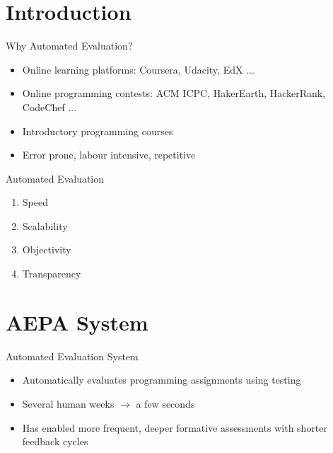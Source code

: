 \documentclass[aspectratio=169]{beamer}
\begin{document}
\section{Introduction}

\begin{frame}{Why Automated Evaluation?}

\begin{itemize}
\item Online learning platforms: Coursera, Udacity, EdX ...
\item Online programming contests: ACM ICPC, HakerEarth, HackerRank, CodeChef ...
\pause
\item Introductory programming courses
\pause
\item Error prone, labour intensive, repetitive
\end{itemize}
\end{frame}

\begin{frame}[fragile]{Automated Evaluation}

\begin{enumerate}
\item Speed
\item Scalability
\item Objectivity
\item Transparency
\end{enumerate}
\end{frame}


\section{AEPA System}
\begin{frame}{Automated Evaluation System}

\begin{itemize}
\item Automatically evaluates programming assignments using testing
\item Several human weeks $\longrightarrow$ a few seconds
\item Has enabled more frequent, deeper formative assessments with shorter feedback cycles
\end{itemize}
\end{frame}
\end{document}
